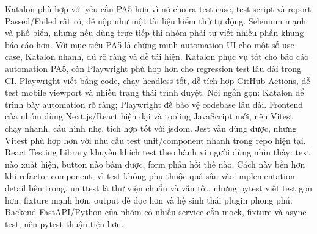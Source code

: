 {}\markdownRendererSectionBegin
{}\markdownRendererInterblockSeparator
{}Katalon phù hợp với yêu cầu PA5 hơn vì nó cho ra test case, test script và report Passed/Failed rất rõ, dễ nộp như một tài liệu kiểm thử tự động.\markdownRendererParagraphSeparator
{}Selenium mạnh và phổ biến, nhưng nếu dùng trực tiếp thì nhóm phải tự viết nhiều phần khung báo cáo hơn. Với mục tiêu PA5 là chứng minh automation UI cho một số use case, Katalon nhanh, đủ rõ ràng và dễ tái hiện.\markdownRendererInterblockSeparator
{}
\markdownRendererSectionEnd \markdownRendererSectionBegin
{}\markdownRendererInterblockSeparator
{}Katalon phục vụ tốt cho báo cáo automation PA5, còn Playwright phù hợp hơn cho regression test lâu dài trong CI.\markdownRendererParagraphSeparator
{}Playwright viết bằng code, chạy headless tốt, dễ tích hợp GitHub Actions, dễ test mobile viewport và nhiều trạng thái trình duyệt.\markdownRendererParagraphSeparator
{}Nói ngắn gọn: Katalon để trình bày automation rõ ràng; Playwright để bảo vệ codebase lâu dài.\markdownRendererInterblockSeparator
{}
\markdownRendererSectionEnd \markdownRendererSectionBegin
{}\markdownRendererInterblockSeparator
{}Frontend của nhóm dùng Next.js/React hiện đại và tooling JavaScript mới, nên Vitest chạy nhanh, cấu hình nhẹ, tích hợp tốt với jsdom.\markdownRendererParagraphSeparator
{}Jest vẫn dùng được, nhưng Vitest phù hợp hơn với nhu cầu test unit/component nhanh trong repo hiện tại.\markdownRendererInterblockSeparator
{}
\markdownRendererSectionEnd \markdownRendererSectionBegin
{}\markdownRendererInterblockSeparator
{}React Testing Library khuyến khích test theo hành vi người dùng nhìn thấy: text nào xuất hiện, button nào bấm được, form phản hồi thế nào.\markdownRendererParagraphSeparator
{}Cách này bền hơn khi refactor component, vì test không phụ thuộc quá sâu vào implementation detail bên trong.\markdownRendererInterblockSeparator
{}
\markdownRendererSectionEnd \markdownRendererSectionBegin
{}\markdownRendererInterblockSeparator
{}unittest là thư viện chuẩn và vẫn tốt, nhưng pytest viết test gọn hơn, fixture mạnh hơn, output dễ đọc hơn và hệ sinh thái plugin phong phú.\markdownRendererParagraphSeparator
{}Backend FastAPI/Python của nhóm có nhiều service cần mock, fixture và async test, nên pytest thuận tiện hơn.\markdownRendererInterblockSeparator
